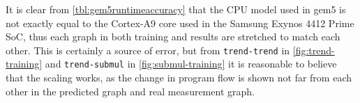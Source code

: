 It is clear from \autoref{tbl:gem5runtimeaccuracy} that the CPU model used
in gem5 is not exactly equal to the Cortex-A9 core used in the Samsung Exynos
4412 Prime SoC, thus each graph in both training and results are stretched to
match each other. This is certainly a source of error, but from
\texttt{trend-trend} in \autoref{fig:trend-training} and \texttt{trend-submul}
in \autoref{fig:submul-training} it is reasonable to believe that the scaling
works, as the change in program flow is shown not far from each other in the
predicted graph and real measurement graph.
